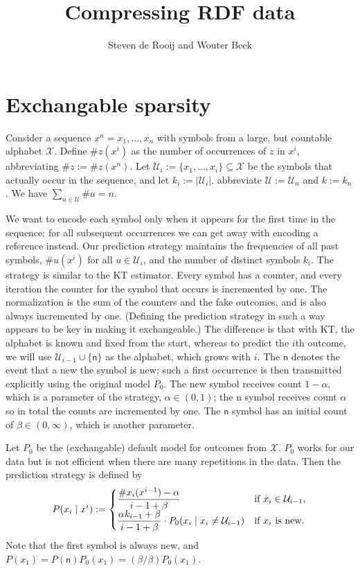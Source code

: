 \documentclass{article}
\author{Steven de Rooij and Wouter Beek}
\title{Compressing RDF data}
\newcommand{\X}{{\mathcal X}}
\newcommand{\U}{{\mathcal U}}
\newcommand{\df}{:=}
\newcommand{\tn}{\textnormal}
\begin{document}
\maketitle


\section{Exchangable sparsity}

Consider a sequence $x^n=x_1,\ldots,x_n$ with symbols from a large,
but countable alphabet $\X$. Define $\#z(x^i)$ as the number of
occurrences of $z$ in $x^i$, abbreviating $\#z\df\#z(x^n)$.  Let 
$\U_i\df\{x_1,\ldots,x_i\}\subseteq\X$ 
be the symbols that actually occur in the sequence, and let $k_i\df|\U_i|$. abbreviate
$\U\df\U_n$ and $k\df k_n$. We have $\sum_{u\in\U}\#u=n$.

We want to encode each symbol only when it appears for the first time
in the sequence; for all subsequent occurrences we can get away with
encoding a reference instead. Our prediction strategy maintains the
frequencies of all past symbols, $\#u(x^i)$ for all $u\in\U_i$, and
the number of distinct symbols $k_i$. The strategy is similar to the
KT estimator. Every symbol has a counter, and every iteration the
counter for the symbol that occurs is incremented by one. The
normalization is the sum of the counters and the fake outcomes, and is
also always incremented by one. (Defining the prediction strategy in
such a way appears to be key in making it exchangeable.) The
difference is that with KT, the alphabet is known and fixed from the
start, whereas to predict the $i$th outcome, we will use
$\U_{i-1}\cup\{\textsf{n}\}$ as the alphabet, which grows with
$i$. The $\textsf{n}$ denotes the event that a new the symbol is new;
such a first occurrence is then transmitted explicitly using the
original model $P_0$. The new symbol receives count $1-\alpha$, which
is a parameter of the strategy, $\alpha\in(0,1)$; the \textsf{n}
symbol receives count $\alpha$ so in total the counts are incremented
by one. The $\textsf{n}$ symbol has an initial count of
$\beta\in(0,\infty)$, which is another parameter.

Let $P_0$ be the (exchangable) default model for outcomes from
$\X$. $P_0$ works for our data but is not efficient when there are many
repetitions in the data. Then the prediction strategy is defined by
\[
P(x_i\mid x^i)\df\begin{cases}
\displaystyle\frac{\#x_i(x^{i-1})-\alpha}{i-1+\beta}&\tn{if $x_i\in\U_{i-1}$,}\\
\displaystyle\frac{\alpha k_{i-1}+\beta}{i-1+\beta}\cdot
P_0(x_i\mid x_i\ne\U_{i-1})&\tn{if $x_i$ is new}.
\end{cases}
\]
Note that the first symbol is always new, and
$P(x_1)=P(\textsf{n})P_0(x_1)=(\beta/\beta)P_0(x_1)$.
\end{document}
